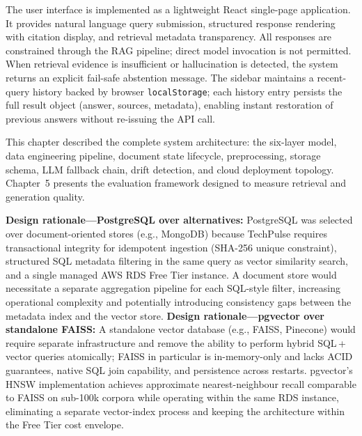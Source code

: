 The user interface is implemented as a lightweight React single-page application. It provides natural language query submission, structured response rendering with citation display, and retrieval metadata transparency. All responses are constrained through the RAG pipeline; direct model invocation is not permitted. When retrieval evidence is insufficient or hallucination is detected, the system returns an explicit fail-safe abstention message. The sidebar maintains a recent-query history backed by browser \texttt{localStorage}; each history entry persists the full result object (answer, sources, metadata), enabling instant restoration of previous answers without re-issuing the API call.

\medskip
\noindent This chapter described the complete system architecture: the six-layer model, data engineering pipeline, document state lifecycle, preprocessing, storage schema, LLM fallback chain, drift detection, and cloud deployment topology. Chapter~5 presents the evaluation framework designed to measure retrieval and generation quality.

\textbf{Design rationale---PostgreSQL over alternatives:} PostgreSQL was selected over document-oriented stores (e.g., MongoDB) because TechPulse requires transactional integrity for idempotent ingestion (SHA-256 unique constraint), structured SQL metadata filtering in the same query as vector similarity search, and a single managed AWS RDS Free Tier instance. A document store would necessitate a separate aggregation pipeline for each SQL-style filter, increasing operational complexity and potentially introducing consistency gaps between the metadata index and the vector store. \textbf{Design rationale---pgvector over standalone FAISS:} A standalone vector database (e.g., FAISS, Pinecone) would require separate infrastructure and remove the ability to perform hybrid SQL\,+\,vector queries atomically; FAISS in particular is in-memory-only and lacks ACID guarantees, native SQL join capability, and persistence across restarts. pgvector's HNSW implementation achieves approximate nearest-neighbour recall comparable to FAISS on sub-100k corpora while operating within the same RDS instance, eliminating a separate vector-index process and keeping the architecture within the Free Tier cost envelope.

